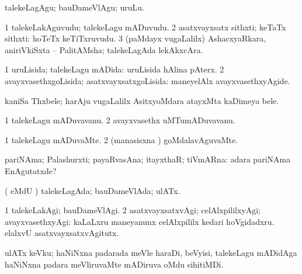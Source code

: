 \noindent
\gl{\akirx}
\expl{}
\bmng
talekeLagAgu; bauDameVlAgu; uruLu. 
\emng
\eentry

\bentry
{}
\gl{\nA}
\expl{}
\bmng
\bnum
\num{1} talekeLakAguvudu; talekeLagu mADuvudu. 
\num{2} asatxvayxsatx sithxti; keTaTx sithxti:  hoTeTx keTiTxruvudu. 
\num{3} (paMdayx \mo vugaLalilx) AshacxyaRkara, aniriVkiSxta -- PalitAMsha; talekeLagAda lekAkxcAra. 
\enum
\emng
\eentry

\bentry
{} 
\gl{\gu}
\expl{}
\bmng
\bnum
\num{1} uruLisida; talekeLagu mADida:  uruLisida hAlina pAterx. 
\num{2} avayxvasethxgoLisida; asatxvayxsatxgoLisida:  maneyelAlx avayxvasethxyAgide. 
\enum
\emng
\eentry

\bentry
{}
\gl{\nA}
\expl{}
\bmng
kaniSa Thxbele; harAju \mo vugaLalilx AsitxyoMdara atayxMta kaDimeya bele. 
\emng
\eentry

\bentry
{} 
\gl{\nA}
\bmng
\bnum
\num{1} talekeLagu mADuvavanu. 
\num{2} avayxvasethx uMTumADuvavanu. 
\enum
\emng
\eentry

\bentry
{} 
\gl{\kirxvi}
\expl{}
\bmng
\bnum
\num{1} talekeLagu mADuvaMte. 
\num{2} (manasisxna \vi) goMdalavAguvaMte. 
\enum
\emng
\eentry

\bentry
{} 
\gl{\nA}
\expl{}
\bmng
pariNAma; Palashurxti; payaRvasAna; itayxthaR; tiVmARna:  adara pariNAma EnAgutatxde? 
\emng
\eentry

\bentry
{} 
\gl{\gu}
\expl{}
\bmng
( eMdU \parx) talekeLagAda; bauDameVlAda; ulATx. 
\emng
\eentry

\bentry
{} 
\gl{\kirxvi}
\expl{}
\bmng
\bnum
\num{1} talekeLakAgi; bauDameVlAgi. 
\num{2} asatxvayxsatxvAgi; celAlxpililxyAgi; avayxvasethxyAgi:  kaLaLxru maneyanunx celAlxpililx kedari hoVgidadxru.  elalxvU asatxvayxsatxvAgitutx. 
\enum
\emng
\eentry

\bentry
{}
\gl{\nA}
\expl{}
\bmng
ulATx keVku; haNiNxna padarada meVle haraDi, beVyisi, talekeLagu mADidAga haNiNxna padara meVliruvaMte mADiruva oMdu sihitiMDi. 
\emng
\eentry

